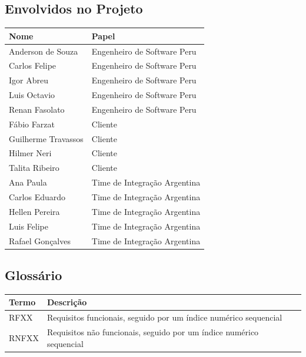 \documentclass[a4paper, 12pt]{article}
\begin{document}
\subsection{Envolvidos no Projeto}
\begin{table}[ht]
	\centering
	
	\begin{tabular}{p{7cm}p{7cm}}
		\hline
		\cellcolor{gray}Nome&\cellcolor{gray}Papel  \\
		\hline
		Anderson de Souza&Engenheiro de Software Peru\\
		Carlos Felipe&Engenheiro de Software Peru\\
		Igor Abreu&Engenheiro de Software Peru\\
		Luis Octavio&Engenheiro de Software Peru\\
		Renan Fasolato&Engenheiro de Software Peru\\
		Fábio Farzat&Cliente\\
		Guilherme Travassos&Cliente\\
		Hilmer Neri&Cliente\\
		Talita Ribeiro&Cliente\\
		Ana Paula&Time de Integração Argentina\\
		Carlos Eduardo&Time de Integração Argentina\\
		Hellen Pereira&Time de Integração Argentina\\
		Luis Felipe&Time de Integração Argentina\\
		Rafael Gonçalves&Time de Integração Argentina\\		
		\hline
	\end{tabular}
\end{table}
\subsection{Glossário}
\begin{table}[ht]
	\centering
	
	\begin{tabular}{p{2cm}p{12cm}}
		\hline
		\cellcolor{gray}Termo&\cellcolor{gray}Descrição  \\
		\hline
		RFXX&Requisitos funcionais, seguido por um índice numérico sequencial\\
		RNFXX&Requisitos não funcionais, seguido por um índice numérico sequencial\\	
		\hline
	\end{tabular}
\end{table}
\end{document}
